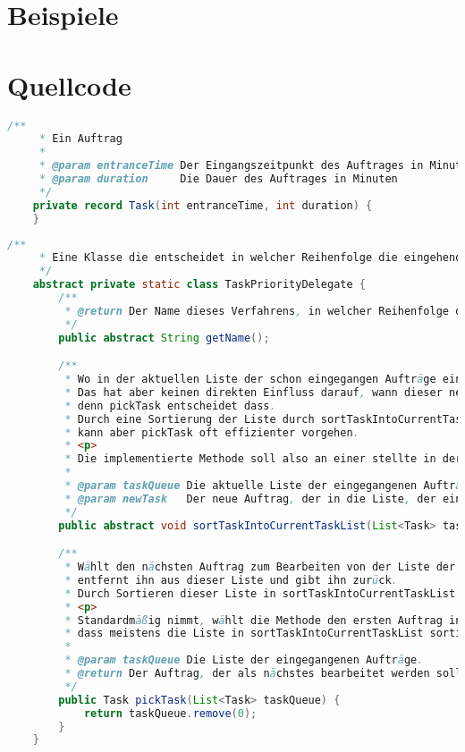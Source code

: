 \documentclass[a4paper,10pt,ngerman]{scrartcl}
\begin{document}
\section{Beispiele}\label{sec:beispiele}


\section{Quellcode}\label{sec:quellcode}\label{LastPage}
\begin{lstlisting}[frame=single,language=Java,title=Klasse Task,breaklines=true]
	/**
     * Ein Auftrag
     *
     * @param entranceTime Der Eingangszeitpunkt des Auftrages in Minuten von t0
     * @param duration     Die Dauer des Auftrages in Minuten
     */
    private record Task(int entranceTime, int duration) {
    }
	\end{lstlisting}
\begin{lstlisting}[frame=single,language=Java,title=Klasse TaskPriorityDelegate,breaklines=true]
	/**
     * Eine Klasse die entscheidet in welcher Reihenfolge die eingehenden Aufträge verwaltet werden sollen.
     */
    abstract private static class TaskPriorityDelegate {
        /**
         * @return Der Name dieses Verfahrens, in welcher Reihenfolge die eingehenden Aufträge verwaltet werden sollen.
         */
        public abstract String getName();

        /**
         * Wo in der aktuellen Liste der schon eingegangen Aufträge ein neuer Auftrag eingehen soll.
         * Das hat aber keinen direkten Einfluss darauf, wann dieser neue Auftrag angenommen werden soll,
         * denn pickTask entscheidet dass.
         * Durch eine Sortierung der Liste durch sortTaskIntoCurrentTaskList
         * kann aber pickTask oft effizienter vorgehen.
         * <p>
         * Die implementierte Methode soll also an einer stellte in der taskQueue den newTask einsortieren.
         *
         * @param taskQueue Die aktuelle Liste der eingegangenen Aufträge
         * @param newTask   Der neue Auftrag, der in die Liste, der eingegangen Aufträge eingenommen werden soll.
         */
        public abstract void sortTaskIntoCurrentTaskList(List<Task> taskQueue, Task newTask);

        /**
         * Wählt den nächsten Auftrag zum Bearbeiten von der Liste der schon eingegangen Aufträge aus,
         * entfernt ihn aus dieser Liste und gibt ihn zurück.
         * Durch Sortieren dieser Liste in sortTaskIntoCurrentTaskList ist ein effizienteres Auswählen möglich.
         * <p>
         * Standardmäßig nimmt, wählt die Methode den ersten Auftrag in der Liste aus, da davon ausgegangen wird,
         * dass meistens die Liste in sortTaskIntoCurrentTaskList sortiert wird.
         *
         * @param taskQueue Die Liste der eingegangenen Aufträge.
         * @return Der Auftrag, der als nächstes bearbeitet werden soll.
         */
        public Task pickTask(List<Task> taskQueue) {
            return taskQueue.remove(0);
        }
    }
	\end{lstlisting}
\end{document}
